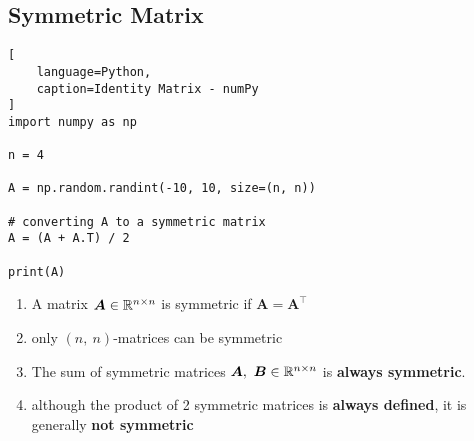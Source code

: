 \subsection{Symmetric Matrix}

\begin{lstlisting}[
    language=Python,
    caption=Identity Matrix - numPy
]
import numpy as np

n = 4

A = np.random.randint(-10, 10, size=(n, n))

# converting A to a symmetric matrix
A = (A + A.T) / 2

print(A)
\end{lstlisting}

\begin{enumerate}
    \item A matrix $\bm{A} \in \mathbb{R}^{n\times n}$ is symmetric if $\bm{A} = \bm{A}^\top$
    \hfill \cite{mfml/book/mml/Deisenroth-Faisal-Ong}

    \item only $(n,\ n)$-matrices can be symmetric
    \hfill \cite{mfml/book/mml/Deisenroth-Faisal-Ong}

    \item The sum of symmetric matrices $\bm{A},\ \bm{B} \in \mbbR^{n\times n}$ is \textbf{always symmetric}.
    \hfill \cite{mfml/book/mml/Deisenroth-Faisal-Ong}

    \item although the product of 2 symmetric matrices is \textbf{always defined}, it is generally \textbf{not symmetric}
    \hfill \cite{mfml/book/mml/Deisenroth-Faisal-Ong}
\end{enumerate}







